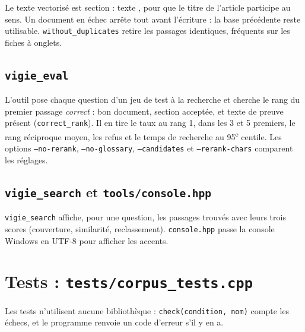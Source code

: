 \documentclass[11pt,a4paper]{article}
\newcommand{\fichier}[1]{\texttt{#1}}
\begin{document}
{{{

Le texte vectorisé est \og section : texte \fg, pour que le titre de l'article participe au sens. Un document en échec arrête tout avant l'écriture : la base précédente reste utilisable. \texttt{without\_duplicates} retire les passages identiques, fréquents sur les fiches à onglets.

\subsection{\texttt{vigie\_eval}}

L'outil pose chaque question d'un jeu de test à la recherche et cherche le rang du premier passage \emph{correct} : bon document, section acceptée, et texte de preuve présent (\texttt{correct\_rank}). Il en tire le taux au rang 1, dans les 3 et 5 premiers, le rang réciproque moyen, les refus et le temps de recherche au 95\textsuperscript{e} centile. Les options \texttt{--no-rerank}, \texttt{--no-glossary}, \texttt{--candidates} et \texttt{--rerank-chars} comparent les réglages.

\subsection{\texttt{vigie\_search} et \texttt{tools/console.hpp}}

\fichier{vigie\_search} affiche, pour une question, les passages trouvés avec leurs trois scores (couverture, similarité, reclassement). \fichier{console.hpp} passe la console Windows en UTF-8 pour afficher les accents.

\section{Tests : \texttt{tests/corpus\_tests.cpp}}

Les tests n'utilisent aucune bibliothèque : \texttt{check(condition, nom)} compte les échecs, et le programme renvoie un code d'erreur s'il y en a.

}}}
\end{document}
